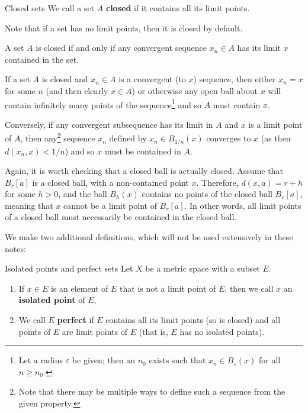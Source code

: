 \begin{bdefin}{Closed sets}{}
We call a set $A$ \textbf{closed} if it contains all its limit points.
\end{bdefin}

Note that if a set has no limit points, then it is closed by default.

\begin{bprop}{}{}
A set $A$ is closed if and only if any convergent sequence $x_{n} \in A$ has its limit $x$ contained in the set.
\end{bprop}
\begin{bproof}{}{}
If a set $A$ is closed and $x_{n} \in A$ is a convergent (to $x$) sequence, then either $x_{n} = x$ for some $n$ (and then clearly $x \in A$) or otherwise any open ball about $x$ will contain infinitely many points of the sequence\footnote{Let a radius $\varepsilon$ be given; then an $n_{0}$ exists such that $x_{n} \in B_{\varepsilon}(x)$ for all $n \geq n_{0}$.} and so $A$ must contain $x$.

Conversely, if any convergent subsequence has its limit in $A$ and $x$ is a limit point of $A$, then any\footnote{Note that there may be multiple ways to define such a sequence from the given property.} sequence $x_{n}$ defined by $x_{n} \in B_{1/n}(x)$ converges to $x$ (as then $d(x_{n},x) < 1/n$) and so $x$ must be contained in $A$.
\eop
\end{bproof}

Again, it is worth checking that a closed ball is actually closed. 
Assume that $B_{r}[a]$ is a closed ball, with a non-contained point $x$. Therefore, $d(x,a) = r + h$ for some $h>0$, and the ball $B_{h}(x)$ contains no points of the closed ball $B_{r}[a]$, meaning that $x$ cannot be a limit point of $B_{r}[a]$. In other words, all limit points of a closed ball must necessarily be contained in the closed ball.

We make two additional definitions, which will not be used extensively in these notes:
\begin{bdefin}{Isolated points and perfect sets}{}
Let $X$ be a metric space with a subset $E$.
\begin{enumerate}
    \item If $x\in E$ is an element of $E$ that is not a limit point of $E$, then we call $x$ an \textbf{isolated point} of $E$,
    \item We call $E$ \textbf{perfect} if $E$ contains all its limit points (so is closed) and all points of $E$ are limit points of $E$ (that is, $E$ has no isolated points).
\end{enumerate}
\end{bdefin}


